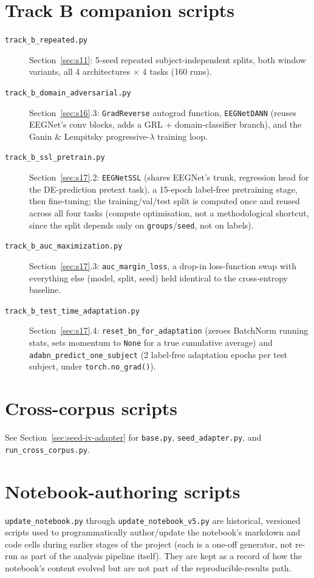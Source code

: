 \documentclass[11pt]{report}
\begin{document}
\section{Track B companion scripts}
\begin{description}
  \item[\texttt{track\_b\_repeated.py}] Section~\ref{sec:s11}: 5-seed
        repeated subject-independent splits, both window variants, all 4
        architectures $\times$ 4 tasks (160 runs).
  \item[\texttt{track\_b\_domain\_adversarial.py}] Section~\ref{sec:s16}.3:
        \texttt{GradReverse} autograd function, \texttt{EEGNetDANN} (reuses
        EEGNet's conv blocks, adds a GRL + domain-classifier branch), and
        the Ganin \& Lempitsky progressive-$\lambda$ training loop.
  \item[\texttt{track\_b\_ssl\_pretrain.py}] Section~\ref{sec:s17}.2:
        \texttt{EEGNetSSL} (shares EEGNet's trunk, regression head for the
        DE-prediction pretext task), a 15-epoch label-free pretraining
        stage, then fine-tuning; the training/val/test split is computed
        once and reused across all four tasks (compute optimisation, not a
        methodological shortcut, since the split depends only on
        \texttt{groups}/\texttt{seed}, not on labels).
  \item[\texttt{track\_b\_auc\_maximization.py}] Section~\ref{sec:s17}.3:
        \texttt{auc\_margin\_loss}, a drop-in loss-function swap with
        everything else (model, split, seed) held identical to the
        cross-entropy baseline.
  \item[\texttt{track\_b\_test\_time\_adaptation.py}] Section~\ref{sec:s17}.4:
        \texttt{reset\_bn\_for\_adaptation} (zeroes BatchNorm running stats,
        sets momentum to \texttt{None} for a true cumulative average) and
        \texttt{adabn\_predict\_one\_subject} (2 label-free adaptation
        epochs per test subject, under \texttt{torch.no\_grad()}).
\end{description}

\section{Cross-corpus scripts}
See Section~\ref{sec:seed-iv-adapter} for \texttt{base.py},
\texttt{seed\_adapter.py}, and \texttt{run\_cross\_corpus.py}.

\section{Notebook-authoring scripts}
\texttt{update\_notebook.py} through \texttt{update\_notebook\_v5.py} are
historical, versioned scripts used to programmatically author/update the
notebook's markdown and code cells during earlier stages of the project
(each is a one-off generator, not re-run as part of the analysis pipeline
itself). They are kept as a record of how the notebook's content evolved
but are not part of the reproducible-results path.
\end{document}

